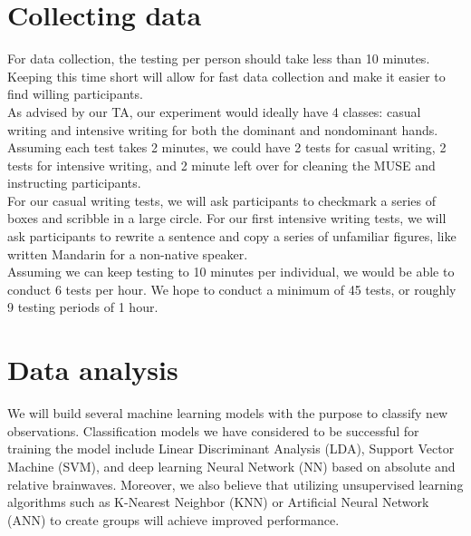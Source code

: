 \documentclass[a4paper]{article}
\begin{document}


\section{Collecting data}

For data collection, the testing per person should take less than 10 minutes. Keeping this time short will allow for fast data collection and make it easier to find willing participants.\\

As advised by our TA, our experiment would ideally have 4 classes: casual writing and intensive writing for both the dominant and nondominant hands. Assuming each test takes 2 minutes, we could have 2 tests for casual writing, 2 tests for intensive writing, and 2 minute left over for cleaning the MUSE and instructing participants.\\

For our casual writing tests, we will ask participants to checkmark a series of boxes and scribble in a large circle. For our first intensive writing tests, we will ask participants to rewrite a sentence and copy a series of unfamiliar figures, like written Mandarin for a non-native speaker.\\

Assuming we can keep testing to 10 minutes per individual, we would be able to conduct 6 tests per hour. We hope to conduct a minimum of 45 tests, or roughly 9 testing periods of 1 hour.\\



\section{Data analysis}

We will build several machine learning models with the purpose to classify new observations. Classification models we have considered to be successful for training the model include Linear Discriminant Analysis (LDA), Support Vector Machine (SVM), and deep learning Neural Network (NN) based on absolute and relative brainwaves. Moreover, we also believe that utilizing unsupervised learning algorithms such as K-Nearest Neighbor (KNN) or Artificial Neural Network (ANN) to create groups will achieve improved performance.\\
\end{document}
